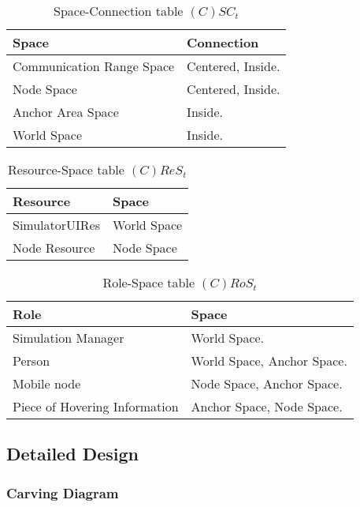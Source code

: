 \begin{table}[H]
	\centering
	\begin{tabular}{|p{4cm}|p{8cm}|}
			\hline
			\textbf{Space} & \textbf{Connection} \\
			\hline
			Communication Range Space & Centered, Inside. \\
			\hline
			Node Space & Centered, Inside. \\
			\hline
			Anchor Area Space & Inside. \\
			\hline
			World Space & Inside. \\
			\hline
		\end{tabular}
	\caption{Space-Connection table $(C)SC_t$}
	\label{tab:sct}
\end{table}

\begin{table}[H]
	\centering
	\begin{tabular}{|p{4cm}|p{8cm}|}
			\hline
			\textbf{Resource} & \textbf{Space} \\
			\hline
			SimulatorUIRes & World Space \\
			\hline
			Node Resource & Node Space \\
			\hline
		\end{tabular}
	\caption{Resource-Space table $(C)ReS_t$}
	\label{tab:crest}
\end{table}

\begin{table}[H]
	\centering
	\begin{tabular}{|p{4cm}|p{8cm}|}
			\hline
			\textbf{Role} & \textbf{Space} \\
			\hline
			Simulation Manager & World Space. \\
			\hline
			Person & World Space, Anchor Space. \\
			\hline
			Mobile node & Node Space, Anchor Space. \\
			\hline
			Piece of Hovering Information & Anchor Space, Node Space. \\
			\hline
		\end{tabular}
	\caption{Role-Space table $(C)RoS_t$}
	\label{tab:cost}
\end{table}

\subsection{Detailed Design}

\subsubsection{Carving Diagram}


